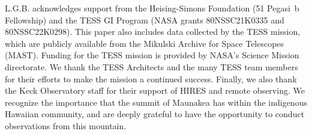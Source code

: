 \documentclass[12pt,twocolumn]{aastex63}
\begin{document}


\acknowledgements
\raggedbottom
L.G.B{.} acknowledges support from the Heising-Simons Foundation (51 Pegasi~b
Fellowship)
and the TESS GI Program (NASA grants
80NSSC21K0335 and 80NSSC22K0298).
%
%
This paper also includes data collected by the TESS mission, which are
publicly available from the Mikulski Archive for Space Telescopes
(MAST).
%
Funding for the TESS mission is provided by NASA's Science Mission
directorate.
%
We thank the TESS Architects
and the many TESS team members for their
efforts to make the mission a continued success.
%
%
%
%
Finally, we also thank the Keck Observatory staff for their support of
HIRES and remote observing.  We recognize the importance that the
summit of Maunakea has within the indigenous Hawaiian community, and
are deeply grateful to have the opportunity to conduct observations
from this mountain.
%
%


%
\end{document}
